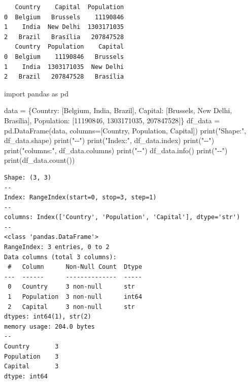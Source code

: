 \documentclass[
  polish,
  letterpaper,
  DIV=11,
  numbers=noendperiod]{scrreprt}
\newenvironment{Shaded}{\begin{snugshade}}{\end{snugshade}}
\newcommand{\BuiltInTok}[1]{\textcolor[rgb]{0.00,0.23,0.31}{#1}}
\newcommand{\DecValTok}[1]{\textcolor[rgb]{0.68,0.00,0.00}{#1}}
\newcommand{\ImportTok}[1]{\textcolor[rgb]{0.00,0.46,0.62}{#1}}
\newcommand{\NormalTok}[1]{\textcolor[rgb]{0.00,0.23,0.31}{#1}}
\newcommand{\OperatorTok}[1]{\textcolor[rgb]{0.37,0.37,0.37}{#1}}
\newcommand{\StringTok}[1]{\textcolor[rgb]{0.13,0.47,0.30}{#1}}
\begin{document}
\begin{verbatim}
   Country    Capital  Population
0  Belgium   Brussels    11190846
1    India  New Delhi  1303171035
2   Brazil   Brasília   207847528
   Country  Population    Capital
0  Belgium    11190846   Brussels
1    India  1303171035  New Delhi
2   Brazil   207847528   Brasília
\end{verbatim}

\begin{Shaded}
\begin{Highlighting}[]
\ImportTok{import}\NormalTok{ pandas }\ImportTok{as}\NormalTok{ pd}

\NormalTok{data }\OperatorTok{=}\NormalTok{ \{}\StringTok{\textquotesingle{}Country\textquotesingle{}}\NormalTok{: [}\StringTok{\textquotesingle{}Belgium\textquotesingle{}}\NormalTok{, }\StringTok{\textquotesingle{}India\textquotesingle{}}\NormalTok{, }\StringTok{\textquotesingle{}Brazil\textquotesingle{}}\NormalTok{],}
        \StringTok{\textquotesingle{}Capital\textquotesingle{}}\NormalTok{: [}\StringTok{\textquotesingle{}Brussels\textquotesingle{}}\NormalTok{, }\StringTok{\textquotesingle{}New Delhi\textquotesingle{}}\NormalTok{, }\StringTok{\textquotesingle{}Brasília\textquotesingle{}}\NormalTok{],}
        \StringTok{\textquotesingle{}Population\textquotesingle{}}\NormalTok{: [}\DecValTok{11190846}\NormalTok{, }\DecValTok{1303171035}\NormalTok{, }\DecValTok{207847528}\NormalTok{]\}}
\NormalTok{df\_data }\OperatorTok{=}\NormalTok{ pd.DataFrame(data, columns}\OperatorTok{=}\NormalTok{[}\StringTok{\textquotesingle{}Country\textquotesingle{}}\NormalTok{, }\StringTok{\textquotesingle{}Population\textquotesingle{}}\NormalTok{, }\StringTok{\textquotesingle{}Capital\textquotesingle{}}\NormalTok{])}
\BuiltInTok{print}\NormalTok{(}\StringTok{"Shape:"}\NormalTok{, df\_data.shape)}
\BuiltInTok{print}\NormalTok{(}\StringTok{"{-}{-}"}\NormalTok{)}
\BuiltInTok{print}\NormalTok{(}\StringTok{"Index:"}\NormalTok{, df\_data.index)}
\BuiltInTok{print}\NormalTok{(}\StringTok{"{-}{-}"}\NormalTok{)}
\BuiltInTok{print}\NormalTok{(}\StringTok{"columns:"}\NormalTok{, df\_data.columns)}
\BuiltInTok{print}\NormalTok{(}\StringTok{"{-}{-}"}\NormalTok{)}
\NormalTok{df\_data.info()}
\BuiltInTok{print}\NormalTok{(}\StringTok{"{-}{-}"}\NormalTok{)}
\BuiltInTok{print}\NormalTok{(df\_data.count())}
\end{Highlighting}
\end{Shaded}

\begin{verbatim}
Shape: (3, 3)
--
Index: RangeIndex(start=0, stop=3, step=1)
--
columns: Index(['Country', 'Population', 'Capital'], dtype='str')
--
<class 'pandas.DataFrame'>
RangeIndex: 3 entries, 0 to 2
Data columns (total 3 columns):
 #   Column      Non-Null Count  Dtype
---  ------      --------------  -----
 0   Country     3 non-null      str  
 1   Population  3 non-null      int64
 2   Capital     3 non-null      str  
dtypes: int64(1), str(2)
memory usage: 204.0 bytes
--
Country       3
Population    3
Capital       3
dtype: int64
\end{verbatim}
\end{document}
